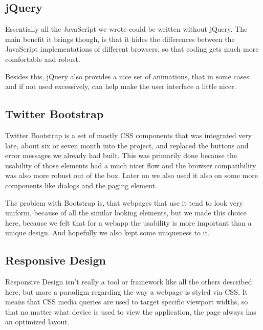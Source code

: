 \subsection{jQuery}

Essentially all the JavaScript we wrote could be written without jQuery. The main benefit it brings though, is that it hides the differences between the JavaScript implementations of different browsers, so that coding gets much more comfortable and robust.

Besides this, jQuery also provides a nice set of animations, that in some cases and if not used excessively, can help make the user interface a little nicer.

\subsection{Twitter Bootstrap}

Twitter Bootstrap is a set of mostly CSS components that was integrated very late, about six or seven month into the project, and replaced the buttons and error messages we already had built. This was primarily done because the usability of those elements had a much nicer flow and the browser compatibility was also more robust out of the box.
Later on we also used it also on some more components like dialogs and the paging element.

The problem with Bootstrap is, that webpages that use it tend to look very uniform, because of all the similar looking elements, but we made this choice here, because we felt that for a webapp the usability is more important than a unique design. And hopefully we also kept some uniqueness to it.

\subsection{Responsive Design}

Responsive Design isn't really a tool or framework like all the others described here, but more a paradigm regarding the way a webpage is styled via CSS. It means that CSS media queries are used to target specific viewport widths, so that no matter what device is used to view the application, the page always has an optimized layout.
